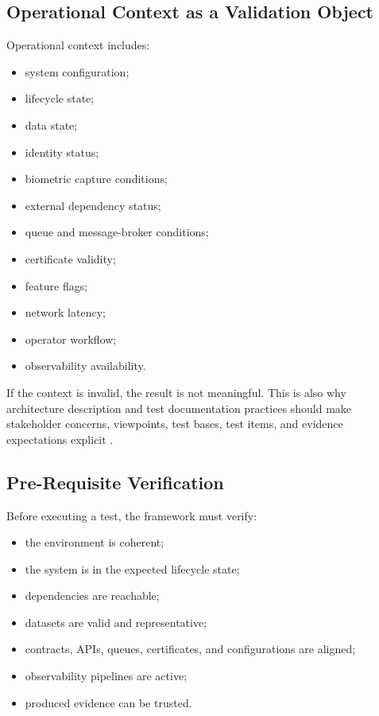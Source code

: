 \documentclass[11pt,a4paper]{article}
\begin{document}
\subsection{Operational Context as a Validation Object}

Operational context includes:
\begin{itemize}
\item system configuration;
\item lifecycle state;
\item data state;
\item identity status;
\item biometric capture conditions;
\item external dependency status;
\item queue and message-broker conditions;
\item certificate validity;
\item feature flags;
\item network latency;
\item operator workflow;
\item observability availability.
\end{itemize}

If the context is invalid, the result is not meaningful. This is also why architecture description and test documentation practices should make stakeholder concerns, viewpoints, test bases, test items, and evidence expectations explicit \cite{iso42010,iso29119}.

\subsection{Pre-Requisite Verification}

Before executing a test, the framework must verify:
\begin{itemize}
\item the environment is coherent;
\item the system is in the expected lifecycle state;
\item dependencies are reachable;
\item datasets are valid and representative;
\item contracts, APIs, queues, certificates, and configurations are aligned;
\item observability pipelines are active;
\item produced evidence can be trusted.
\end{itemize}
\end{document}
